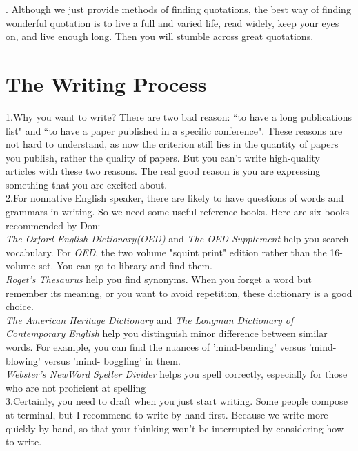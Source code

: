 \documentclass[]{article}
\begin{document}
	. Although we just provide methods of finding quotations, the best way of finding wonderful quotation is to live a full and varied life, read widely, keep your eyes on, and live enough long. Then you will stumble across great quotations.\\
	
	
	
	\section{The Writing Process}
	\noindent1.Why you want to write? There are two bad reason: ``to have a long publications list" and ``to have a paper published in a specific conference". These reasons are not hard to understand, as now the criterion still lies in the quantity of papers you publish, rather the quality of papers. But you can't write high-quality articles with these two reasons. The real good reason is you are expressing something that you are excited about.\\
	
	\noindent2.For nonnative English speaker, there are likely to have questions of words and grammars in writing. So we need some useful reference books. Here are six books recommended by Don:\\
	\textit{The Oxford English Dictionary(OED)} and \textit{The OED Supplement} help you search vocabulary. For \textit{OED}, the two volume "squint print" edition rather than the 16-volume set. You can go to library and find them.\\
	\textit{Roget's Thesaurus }help you find synonyms. When you forget a word but remember its meaning, or you want to avoid repetition, these dictionary is a good choice.\\
	\textit{The American Heritage Dictionary} and \textit{The Longman Dictionary of Contemporary English} help you distinguish minor difference between similar words. For example, you can find the nuances of 'mind-bending' versus 'mind-blowing' versus 'mind-
	boggling' in them.\\
	\textit{Webster's NewWord Speller Divider} helps you spell correctly, especially for those who are not proficient at spelling\\
	
	\noindent3.Certainly, you need to draft when you just start writing. Some people compose at terminal, but I recommend to write by hand first. Because we write more quickly by hand, so that your thinking won't be interrupted by considering how to write.\\
	
\end{document}
